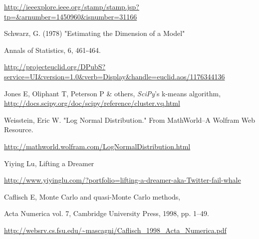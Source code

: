 \documentclass{report}
\begin{document}
\begin{thebibliography}{9}
\url{http://ieeexplore.ieee.org/stamp/stamp.jsp?tp=&arnumber=1450960&isnumber=31166}

 Schwarz, G. (1978) "Estimating the Dimension of a Model"

Annals of Statistics, 6, 461-464.

\url{http://projecteuclid.org/DPubS?service=UI&version=1.0&verb=Display&handle=euclid.aos/1176344136}

 Jones E, Oliphant T, Peterson P \& others, \emph{SciPy}'s k-means algorithm, \url{http://docs.scipy.org/doc/scipy/reference/cluster.vq.html}

 Weisstein, Eric W. "Log Normal Distribution." From MathWorld--A Wolfram Web Resource.

\url{http://mathworld.wolfram.com/LogNormalDistribution.html}

 Yiying Lu, Lifting a Dreamer

\url{http://www.yiyinglu.com/?portfolio=lifting-a-dreamer-aka-Twitter-fail-whale}

 Caflisch E, Monte Carlo and quasi-Monte Carlo methods,

Acta Numerica vol. 7, Cambridge University Press, 1998, pp. 1–49.

\url{http://websrv.cs.fsu.edu/~mascagni/Caflisch_1998_Acta_Numerica.pdf}

\end{thebibliography}
\end{document}
